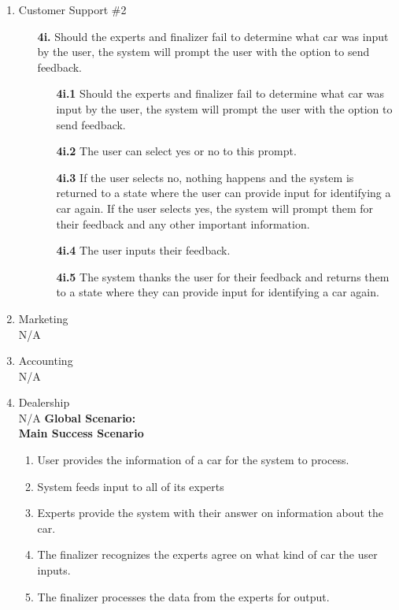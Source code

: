 \documentclass[]{article}
\begin{document}
\begin{enumerate}[label={\bf BE\arabic*.}]
\begin{enumerate}[label={\bf VP\arabic*.}]
\begin{enumerate}
		\end{enumerate}
		\item Customer Support \#2
		\begin{enumerate}
			\color{red}
			\item[\textbf{4i.}] Should the experts and finalizer fail to determine what car was input by the user, the system will prompt the user with the option to send feedback.
			\begin{enumerate}
				\item[\textbf{4i.1}] Should the experts and finalizer fail to determine what car was input by the user, the system will prompt the user with the option to send feedback.
				\item[\textbf{4i.2}] The user can select yes or no to this prompt.
				\item[\textbf{4i.3}] If the user selects no, nothing happens and the system is returned to a state where the user can provide input for identifying a car again. If the user selects yes, the system will prompt them for their feedback and any other important information.
				\item[\textbf{4i.4}] The user inputs their feedback.
				\item[\textbf{4i.5}] The system thanks the user for their feedback and returns them to a state where they can provide input for identifying a car again.
			\end{enumerate}
		\end{enumerate}
		\item Marketing\\
		N/A
		\item Accounting\\
		N/A
		\item Dealership\\
		N/A
		{\bf Global Scenario:}\\
		\textbf{Main Success Scenario}
		\begin{enumerate}[label={\bf \arabic*.}]
			\color{red}
			\item User provides the information of a car for the system to process.
			\item System feeds input to all of its experts
			\item Experts provide the system with their answer on information about the car.
			\item The finalizer recognizes the experts agree on what kind of car the user inputs.
			\item The finalizer processes the data from the experts for output.

\end{enumerate}
\end{enumerate}
\end{enumerate}
\end{document}

